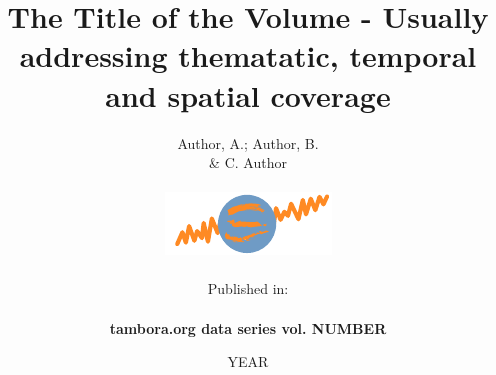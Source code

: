 
\title{The Title of the Volume - Usually addressing thematatic, temporal and spatial coverage}
\author{Author, A.; Author, B.\\ \& C. Author\\\\
\includegraphics[scale=3]{fig/logo.pdf}\\\\
Published in:\\\\
\textbf{tambora.org data series vol. NUMBER}
        }
        \publishers{Glaser, R.; Kahle, M. \& R. Hologa (Eds.)
        }
\date{YEAR}